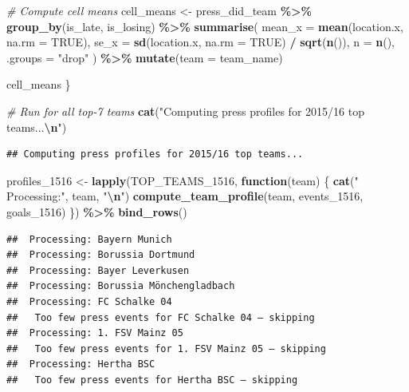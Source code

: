 \documentclass[
]{article}
\newenvironment{Shaded}{\begin{snugshade}}{\end{snugshade}}
\newcommand{\AttributeTok}[1]{\textcolor[rgb]{0.13,0.29,0.53}{#1}}
\newcommand{\CommentTok}[1]{\textcolor[rgb]{0.56,0.35,0.01}{\textit{#1}}}
\newcommand{\ConstantTok}[1]{\textcolor[rgb]{0.56,0.35,0.01}{#1}}
\newcommand{\ControlFlowTok}[1]{\textcolor[rgb]{0.13,0.29,0.53}{\textbf{#1}}}
\newcommand{\FunctionTok}[1]{\textcolor[rgb]{0.13,0.29,0.53}{\textbf{#1}}}
\newcommand{\NormalTok}[1]{#1}
\newcommand{\OtherTok}[1]{\textcolor[rgb]{0.56,0.35,0.01}{#1}}
\newcommand{\SpecialCharTok}[1]{\textcolor[rgb]{0.81,0.36,0.00}{\textbf{#1}}}
\newcommand{\StringTok}[1]{\textcolor[rgb]{0.31,0.60,0.02}{#1}}
\begin{document}
\begin{Shaded}
\begin{Highlighting}[]
  \CommentTok{\# Compute cell means}
\NormalTok{  cell\_means }\OtherTok{\textless{}{-}}\NormalTok{ press\_did\_team }\SpecialCharTok{\%\textgreater{}\%}
    \FunctionTok{group\_by}\NormalTok{(is\_late, is\_losing) }\SpecialCharTok{\%\textgreater{}\%}
    \FunctionTok{summarise}\NormalTok{(}
      \AttributeTok{mean\_x =} \FunctionTok{mean}\NormalTok{(location.x, }\AttributeTok{na.rm =} \ConstantTok{TRUE}\NormalTok{),}
      \AttributeTok{se\_x   =} \FunctionTok{sd}\NormalTok{(location.x,   }\AttributeTok{na.rm =} \ConstantTok{TRUE}\NormalTok{) }\SpecialCharTok{/} \FunctionTok{sqrt}\NormalTok{(}\FunctionTok{n}\NormalTok{()),}
      \AttributeTok{n      =} \FunctionTok{n}\NormalTok{(),}
      \AttributeTok{.groups =} \StringTok{"drop"}
\NormalTok{    ) }\SpecialCharTok{\%\textgreater{}\%}
    \FunctionTok{mutate}\NormalTok{(}\AttributeTok{team =}\NormalTok{ team\_name)}
  
\NormalTok{  cell\_means}
\NormalTok{\}}

\CommentTok{\# Run for all top{-}7 teams}
\FunctionTok{cat}\NormalTok{(}\StringTok{"Computing press profiles for 2015/16 top teams...}\SpecialCharTok{\textbackslash{}n}\StringTok{"}\NormalTok{)}
\end{Highlighting}
\end{Shaded}

\begin{verbatim}
## Computing press profiles for 2015/16 top teams...
\end{verbatim}

\begin{Shaded}
\begin{Highlighting}[]
\NormalTok{profiles\_1516 }\OtherTok{\textless{}{-}} \FunctionTok{lapply}\NormalTok{(TOP\_TEAMS\_1516, }\ControlFlowTok{function}\NormalTok{(team) \{}
  \FunctionTok{cat}\NormalTok{(}\StringTok{" Processing:"}\NormalTok{, team, }\StringTok{"}\SpecialCharTok{\textbackslash{}n}\StringTok{"}\NormalTok{)}
  \FunctionTok{compute\_team\_profile}\NormalTok{(team, events\_1516, goals\_1516)}
\NormalTok{\}) }\SpecialCharTok{\%\textgreater{}\%}
  \FunctionTok{bind\_rows}\NormalTok{()}
\end{Highlighting}
\end{Shaded}

\begin{verbatim}
##  Processing: Bayern Munich 
##  Processing: Borussia Dortmund 
##  Processing: Bayer Leverkusen 
##  Processing: Borussia Mönchengladbach 
##  Processing: FC Schalke 04 
##   Too few press events for FC Schalke 04 — skipping
##  Processing: 1. FSV Mainz 05 
##   Too few press events for 1. FSV Mainz 05 — skipping
##  Processing: Hertha BSC 
##   Too few press events for Hertha BSC — skipping
\end{verbatim}
\end{document}
